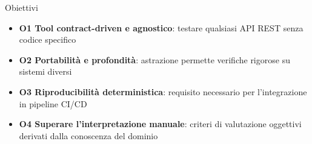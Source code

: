 
\begin{frame}{Obiettivi}
  \begin{itemize}
    \item \textbf{O1 Tool contract-driven e agnostico}: testare \alert{qualsiasi API REST} senza codice specifico

    \item \textbf{O2 Portabilità e profondità}: \alert{astrazione} permette verifiche rigorose su \alert{sistemi diversi}

    \item \textbf{O3 Riproducibilità deterministica}: requisito necessario per l'integrazione in \alert{pipeline CI/CD}

    \item \textbf{O4 Superare l'interpretazione manuale}: \alert{criteri di valutazione} oggettivi derivati dalla \alert{conoscenza del dominio}
  \end{itemize}
\end{frame}